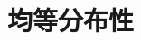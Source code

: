 \documentclass[cjk, dvips, handout, trans, xcolor=dvipsnames]{beamer}
\begin{document}

\section{均等分布性}
\end{document}
